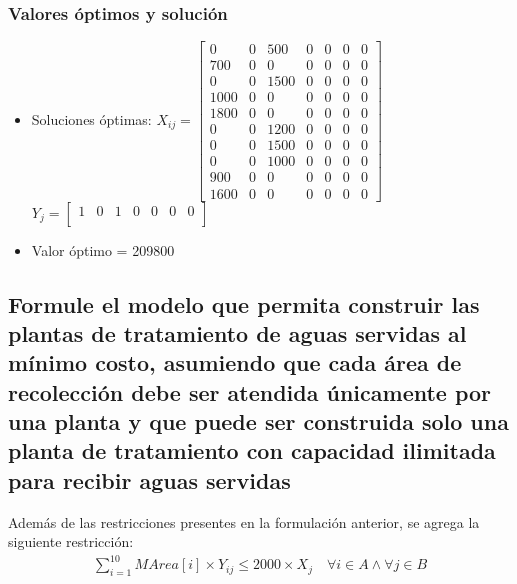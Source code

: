 \documentclass[a4paper,12pt]{article}
\begin{document}
\subsubsection{Valores óptimos y solución}
\begin{itemize}
	\item Soluciones óptimas: $X_{ij}=
	\begin{bmatrix}
	0 & 0 & 500 & 0 & 0 & 0 & 0\\
	700 & 0 & 0 & 0 & 0 & 0 & 0\\
	0 & 0 & 1500 & 0 & 0 & 0 & 0\\
	1000 & 0 & 0 & 0 & 0 & 0 & 0\\
	1800 & 0 & 0 & 0 & 0 & 0 & 0\\
	0 & 0 & 1200 & 0 & 0 & 0 & 0\\
	0 & 0 & 1500 & 0 & 0 & 0 & 0\\
	0 & 0 & 1000 & 0 & 0 & 0 & 0\\
	900 & 0 & 0 & 0 & 0 & 0 & 0\\
	1600 & 0 & 0 & 0 & 0 & 0 & 0
	\end{bmatrix}$
	\\
	$Y_{j}=
	\begin{bmatrix}
	1 & 0 & 1 & 0 & 0 & 0 & 0\\
	\end{bmatrix}$
	\item Valor óptimo = 209800
\end{itemize}
\subsection{Formule  el  modelo  que  permita  construir  las  plantas de  tratamiento  de  aguas  servidas  al  mínimo  costo, asumiendo  que  cada  área  de  recolección  debe  ser  atendida  únicamente  por  una  planta  y  que  puede  ser construida solo una planta de tratamiento con capacidad ilimitada para recibir aguas servidas}
Además de las restricciones presentes en la formulación anterior, se agrega la siguiente restricción:
\begin{equation*}
\begin{split}
\sum_{i=1}^{10}MArea[i]\times Y_{ij}\leq 2000\times X_j\quad\forall i\in A \wedge \forall j \in B
\end{split}
\end{equation*}
\end{document}
